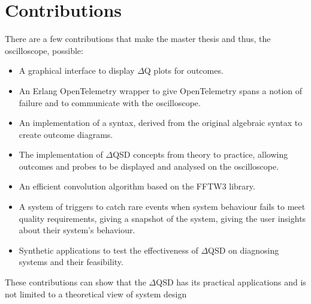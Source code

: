 \section{Contributions}
    There are a few contributions that make the master thesis and thus, the oscilloscope, possible:
    \begin{itemize}
        \item A graphical interface to display $\Delta$Q plots for outcomes.
        \item An Erlang OpenTelemetry wrapper to give OpenTelemetry spans a notion of failure and to communicate with the oscilloscope.
        \item An implementation of a syntax, derived from the original algebraic syntax to create outcome diagrams. 
        \item The implementation of $\Delta$QSD concepts from theory to practice, allowing outcomes and probes to be displayed and analysed on the oscilloscope.
        \item An efficient convolution algorithm based on the FFTW3 library.
        \item A system of triggers to catch rare events when system behaviour fails to meet quality requirements, giving a snapshot of the system, giving the user insights about their system's behaviour.
        \item Synthetic applications to test the effectiveness of $\Delta$QSD on diagnosing systems and their feasibility.
    \end{itemize}
    These contributions can show that the $\Delta$QSD has its practical applications and is not limited to a theoretical view of system design

